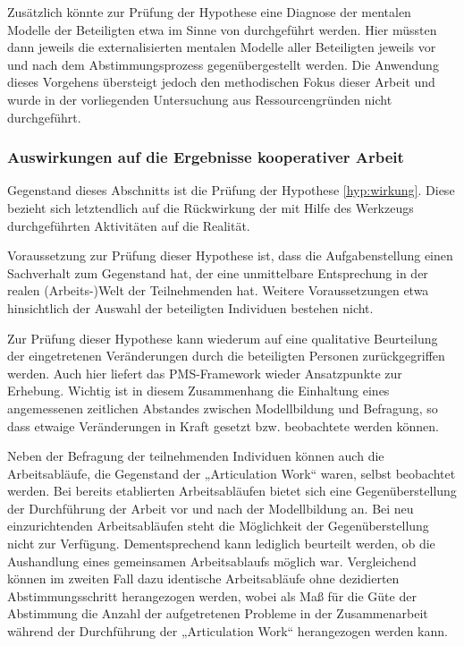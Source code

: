 Zusätzlich könnte zur Prüfung der Hypothese eine Diagnose der mentalen Modelle der Beteiligten etwa im Sinne von \citep{Ifenthaler06} durchgeführt werden. Hier müssten dann jeweils die externalisierten mentalen Modelle aller Beteiligten jeweils vor und nach dem Abstimmungsprozess gegenübergestellt werden. Die Anwendung dieses Vorgehens übersteigt jedoch den methodischen Fokus dieser Arbeit und wurde in der vorliegenden Untersuchung aus Ressourcengründen nicht durchgeführt.


\subsubsection{Auswirkungen auf die Ergebnisse kooperativer Arbeit} %
\label{ssub:auswirkungen_auf_die_ergebnisse_kooperativer_arbeit}

Gegenstand dieses Abschnitts ist die Prüfung der Hypothese \ref{hyp:wirkung}. Diese bezieht sich letztendlich auf die Rückwirkung der mit Hilfe des Werkzeugs durchgeführten Aktivitäten auf die Realität.

Voraussetzung zur Prüfung dieser Hypothese ist, dass die Aufgabenstellung einen Sachverhalt zum Gegenstand hat, der eine unmittelbare Entsprechung in der realen (Arbeits-)Welt der Teilnehmenden hat. Weitere Voraussetzungen etwa hinsichtlich der Auswahl der beteiligten Individuen bestehen nicht.

Zur Prüfung dieser Hypothese kann wiederum auf eine qualitative Beurteilung der eingetretenen Veränderungen durch die beteiligten Personen zurückgegriffen werden. Auch hier liefert das \gls{PMS}-Framework \citep{Sedera02} wieder Ansatzpunkte zur Erhebung. Wichtig ist in diesem Zusammenhang die Einhaltung eines angemessenen zeitlichen Abstandes zwischen Modellbildung und Befragung, so dass etwaige Veränderungen in Kraft gesetzt bzw. beobachtete werden können.

Neben der Befragung der teilnehmenden Individuen können auch die Arbeitsabläufe, die Gegenstand der „Articulation Work“ waren, selbst beobachtet werden. Bei bereits etablierten Arbeitsabläufen bietet sich eine Gegenüberstellung der Durchführung der Arbeit vor und nach der Modellbildung an. Bei neu einzurichtenden Arbeitsabläufen steht die Möglichkeit der Gegenüberstellung nicht zur Verfügung. Dementsprechend kann lediglich beurteilt werden, ob die Aushandlung eines gemeinsamen Arbeitsablaufs möglich war. Vergleichend können im zweiten Fall dazu identische Arbeitsabläufe ohne dezidierten Abstimmungsschritt herangezogen werden, wobei als Maß für die Güte der Abstimmung die Anzahl der aufgetretenen Probleme in der Zusammenarbeit während der Durchführung der „Articulation Work“ herangezogen werden kann.


